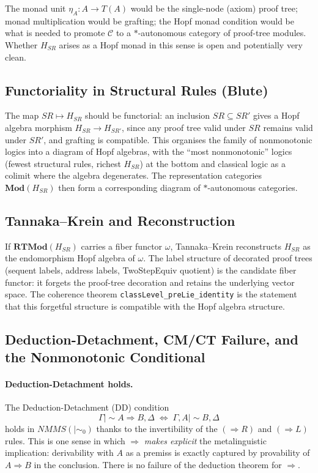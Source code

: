 \documentclass[a4paper,11pt]{report}
\newcommand{\ms}{\mathrel{\mid\!\sim}}
\newcommand{\mszero}{\mathrel{\mid\!\sim_{0}}}
\begin{document}
The monad unit $\eta_A \colon A \to T(A)$ would be the single-node (axiom) proof tree;
monad multiplication would be grafting; the Hopf monad condition would be what is needed
to promote $\mathcal{C}$ to a $*$-autonomous category of proof-tree modules. Whether
$H_{SR}$ arises as a Hopf monad in this sense is open and potentially very clean.

\subsection*{Functoriality in Structural Rules (Blute)}

The map $SR \mapsto H_{SR}$ should be functorial: an inclusion $SR \subseteq SR'$ gives
a Hopf algebra morphism $H_{SR} \to H_{SR'}$, since any proof tree valid under $SR$
remains valid under $SR'$, and grafting is compatible. This organises the family of
nonmonotonic logics into a diagram of Hopf algebras, with the ``most nonmonotonic''
logics (fewest structural rules, richest $H_{SR}$) at the bottom and classical logic
as a colimit where the algebra degenerates. The representation categories
$\mathbf{Mod}(H_{SR})$ then form a corresponding diagram of $*$-autonomous categories.

\subsection*{Tannaka--Krein and Reconstruction}

If $\mathbf{RTMod}(H_{SR})$ carries a fiber functor $\omega$, Tannaka--Krein reconstructs
$H_{SR}$ as the endomorphism Hopf algebra of $\omega$. The label structure of decorated
proof trees (sequent labels, address labels, TwoStepEquiv quotient) is the candidate
fiber functor: it forgets the proof-tree decoration and retains the underlying vector
space. The coherence theorem \texttt{classLevel\_preLie\_identity} is the statement that
this forgetful structure is compatible with the Hopf algebra structure.

\subsection*{Deduction-Detachment, CM/CT Failure, and the Nonmonotonic Conditional}

\paragraph{Deduction-Detachment holds.}
The Deduction-Detachment (DD) condition
\[
  \Gamma \ms A \Rightarrow B, \Delta \;\iff\; \Gamma, A \ms B, \Delta
\]
holds in $\mathit{NMMS}(\mszero)$ thanks to the invertibility of the $(\Rightarrow R)$ and
$(\Rightarrow L)$ rules. This is one sense in which $\Rightarrow$ \emph{makes explicit}
the metalinguistic implication: derivability with $A$ as a premiss is exactly captured by
provability of $A \Rightarrow B$ in the conclusion. There is no failure of the deduction
theorem for $\Rightarrow$.
\end{document}
